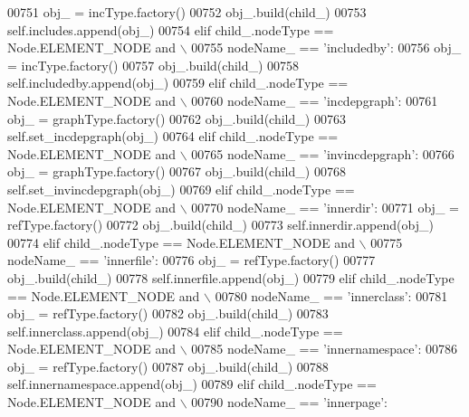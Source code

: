 \begin{DoxyCode}
{{{{{{{{{{{{{{{{{{{{{{{{{{{{{{{{{{{00751             obj\_ = incType.factory()
00752             obj\_.build(child\_)
00753             self.includes.append(obj\_)
00754         \textcolor{keywordflow}{elif} child\_.nodeType == Node.ELEMENT\_NODE \textcolor{keywordflow}{and} \(\backslash\)
00755             nodeName\_ == \textcolor{stringliteral}{'includedby'}:
00756             obj\_ = incType.factory()
00757             obj\_.build(child\_)
00758             self.includedby.append(obj\_)
00759         \textcolor{keywordflow}{elif} child\_.nodeType == Node.ELEMENT\_NODE \textcolor{keywordflow}{and} \(\backslash\)
00760             nodeName\_ == \textcolor{stringliteral}{'incdepgraph'}:
00761             obj\_ = graphType.factory()
00762             obj\_.build(child\_)
00763             self.set_incdepgraph(obj\_)
00764         \textcolor{keywordflow}{elif} child\_.nodeType == Node.ELEMENT\_NODE \textcolor{keywordflow}{and} \(\backslash\)
00765             nodeName\_ == \textcolor{stringliteral}{'invincdepgraph'}:
00766             obj\_ = graphType.factory()
00767             obj\_.build(child\_)
00768             self.set_invincdepgraph(obj\_)
00769         \textcolor{keywordflow}{elif} child\_.nodeType == Node.ELEMENT\_NODE \textcolor{keywordflow}{and} \(\backslash\)
00770             nodeName\_ == \textcolor{stringliteral}{'innerdir'}:
00771             obj\_ = refType.factory()
00772             obj\_.build(child\_)
00773             self.innerdir.append(obj\_)
00774         \textcolor{keywordflow}{elif} child\_.nodeType == Node.ELEMENT\_NODE \textcolor{keywordflow}{and} \(\backslash\)
00775             nodeName\_ == \textcolor{stringliteral}{'innerfile'}:
00776             obj\_ = refType.factory()
00777             obj\_.build(child\_)
00778             self.innerfile.append(obj\_)
00779         \textcolor{keywordflow}{elif} child\_.nodeType == Node.ELEMENT\_NODE \textcolor{keywordflow}{and} \(\backslash\)
00780             nodeName\_ == \textcolor{stringliteral}{'innerclass'}:
00781             obj\_ = refType.factory()
00782             obj\_.build(child\_)
00783             self.innerclass.append(obj\_)
00784         \textcolor{keywordflow}{elif} child\_.nodeType == Node.ELEMENT\_NODE \textcolor{keywordflow}{and} \(\backslash\)
00785             nodeName\_ == \textcolor{stringliteral}{'innernamespace'}:
00786             obj\_ = refType.factory()
00787             obj\_.build(child\_)
00788             self.innernamespace.append(obj\_)
00789         \textcolor{keywordflow}{elif} child\_.nodeType == Node.ELEMENT\_NODE \textcolor{keywordflow}{and} \(\backslash\)
00790             nodeName\_ == \textcolor{stringliteral}{'innerpage'}:
}}}}}}}}}}}}}}}}}}}}}}}}}}}}}}}}}}}
\end{DoxyCode}
